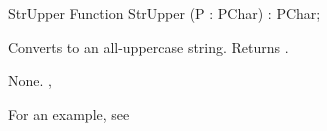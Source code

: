 \latex{}
\html{}
\begin{function}{StrUpper}
\Declaration
Function StrUpper (P : PChar) : PChar;

\Description

Converts  to an all-uppercase string. Returns .

\Errors
None.
\SeeAlso
{}, 
\end{function}
For an example, see 
